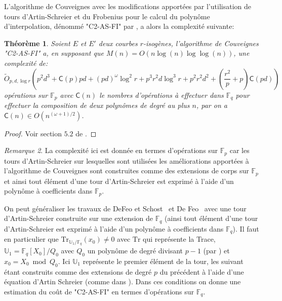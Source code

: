 \documentclass[10pt,a4paper]{book}
\theoremstyle{plain}
\newtheorem{thm}{Théorème}[chapter]
\theoremstyle{definition}
\theoremstyle{definition}
\theoremstyle{definition}
\theoremstyle{definition}
\theoremstyle{definition}
\theoremstyle{remark}
\newtheorem{rem}[thm]{Remarque}
\theoremstyle{remark}
\theoremstyle{definition}
\begin{document}
L'algorithme de Couveignes avec les modifications apportées par l'utilisation 
de tours d'Artin-Schreier et du Frobenius pour le calcul du polynôme 
d'interpolation, dénommé "C2-AS-FI" par \cite{DeFeo11}, a alors la complexité 
suivante:

\begin{thm}
\label{thm:C2:FP}
Soient $E$ et $E'$ deux courbes $r$-isogènes, l'algorithme de Couveignes 
"C2-AS-FI" a, en supposant que $M(n)=O(n \log(n) \log \log (n))$, une complexité
de:
\[
\tilde{O}_{p,d,\log r}(p^2d^3+\mathsf{C}(p)pd+(pd)^{\omega}\log^2 r + p^3 r^2 d \log^3 r + p^2r^2d^2+(\frac{r^2}{p}+p)\mathsf{C}(pd))
\]
opérations sur $\mathbb{F}_p$ avec $\mathsf{C}(n)$ le nombres d'opérations à effectuer dans $\mathbb{F}_q$ pour effectuer la composition de deux polynômes de degré au plus $n$, par \cite{BrentKung78} on a $\mathsf{C}(n) \in O(n^{(\omega+1)/2})$.
\end{thm}

\begin{proof}
Voir section $5.2$ de \cite{DeFeo11}.
\end{proof}

\begin{rem}
La complexité ici est donnée en termes d'opérations sur $\mathbb{F}_p$ car les 
tours d'Artin-Schreier sur lesquelles sont utilisées les améliorations 
apportées à l'algorithme de Couveignes sont construites comme des extensions de
corps sur $\mathbb{F}_p$ et ainsi tout élément d'une tour d'Artin-Schreier est
exprimé à l'aide d'un polynôme à coefficients dans $\mathbb{F}_p$.
\end{rem}

On peut généraliser les travaux de DeFeo et Schost~\cite{DeFeo-Shost'12} et 
De Feo~\cite{DeFeo11} avec une tour d'Artin-Schreier construite sur une 
extension de $\mathbb{F}_q$ (ainsi tout élément d'une tour d'Artin-Schreier est
exprimé à l'aide d'un polynôme à coefficients dans $\mathbb{F}_q$). Il faut en 
particulier que $\mathrm{Tr}_{\mathbb{U}_1/\mathbb{F}_q}(x_0) \neq 0$ avec 
$\mathrm{Tr}$ qui représente la Trace, $\mathbb{U}_1=\mathbb{F}_q[X_0]/Q_0$ 
avec $Q_0$ un polynôme de degré divisant $p-1$ (par \cite{Gunji76}) et 
$x_0=X_0 \bmod Q_0$. Ici $\mathbb{U}_1$ représente le premier élément de la 
tour, les suivant étant construits comme des extensions de degré $p$ du 
précédent à l'aide d'une équation d'Artin Schreier (comme dans 
\cite{DeFeo-Shost'12}). Dans ces conditions on donne une estimation du coût de 
"C2-AS-FI" en termes d'opérations sur $\mathbb{F}_q$.
\end{document}
